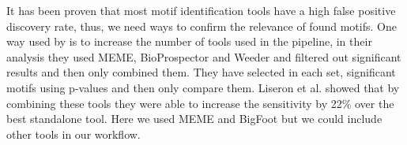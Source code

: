It has been proven that most motif identification tools have a high false positive discovery rate, thus, we need ways to confirm the relevance of found motifs. One way used by \citealt{liseron-monfils_promzea:_2013} is to increase the number of tools used in the pipeline, in their analysis they used MEME, BioProspector and Weeder and filtered out significant results and then only combined them. They have selected in each set, significant motifs using p-values and then only compare them. Liseron et al. showed that by combining these tools they were able to increase the sensitivity by 22\% over the best standalone tool. Here we used MEME and BigFoot but we could include other tools in our workflow.